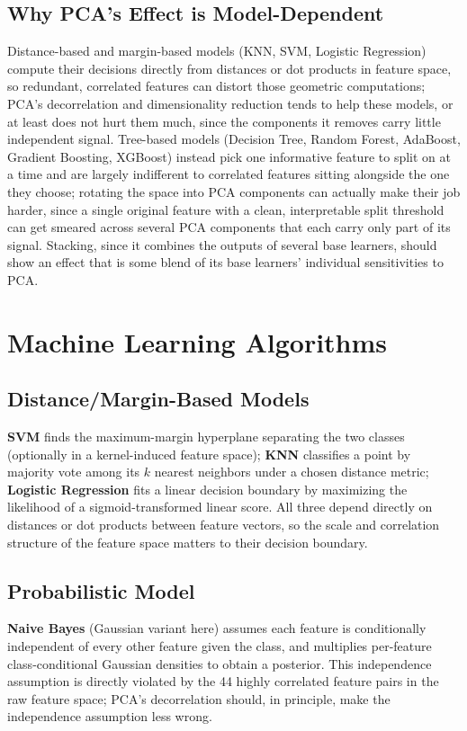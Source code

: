 \documentclass[11pt,a4paper]{article}
\begin{document}
\subsection{Why PCA's Effect is Model-Dependent}
Distance-based and margin-based models (KNN, SVM, Logistic Regression) compute their decisions directly from distances or dot products in feature space, so redundant, correlated features can distort those geometric computations; PCA's decorrelation and dimensionality reduction tends to help these models, or at least does not hurt them much, since the components it removes carry little independent signal. Tree-based models (Decision Tree, Random Forest, AdaBoost, Gradient Boosting, XGBoost) instead pick one informative feature to split on at a time and are largely indifferent to correlated features sitting alongside the one they choose; rotating the space into PCA components can actually make their job harder, since a single original feature with a clean, interpretable split threshold can get smeared across several PCA components that each carry only part of its signal. Stacking, since it combines the outputs of several base learners, should show an effect that is some blend of its base learners' individual sensitivities to PCA.

\section{Machine Learning Algorithms}

\subsection{Distance/Margin-Based Models}
\textbf{SVM} finds the maximum-margin hyperplane separating the two classes (optionally in a kernel-induced feature space); \textbf{KNN} classifies a point by majority vote among its $k$ nearest neighbors under a chosen distance metric; \textbf{Logistic Regression} fits a linear decision boundary by maximizing the likelihood of a sigmoid-transformed linear score. All three depend directly on distances or dot products between feature vectors, so the scale and correlation structure of the feature space matters to their decision boundary.

\subsection{Probabilistic Model}
\textbf{Naive Bayes} (Gaussian variant here) assumes each feature is conditionally independent of every other feature given the class, and multiplies per-feature class-conditional Gaussian densities to obtain a posterior. This independence assumption is directly violated by the 44 highly correlated feature pairs in the raw feature space; PCA's decorrelation should, in principle, make the independence assumption less wrong.
\end{document}
